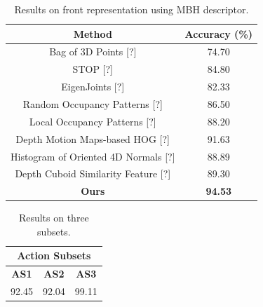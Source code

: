 \documentclass[review]{elsarticle}
\begin{document}
\begin{table}[H]
	\begin{center}
		\begin{tabular}{c|c}
		
		  {\bf Method} & {\bf Accuracy (\%)} \\
		\hline
		Bag of 3D Points [?] &         74.70  \\
		
		      STOP [?] &         84.80  \\
		
		EigenJoints [?] &         82.33  \\
		
		Random Occupancy Patterns [?] &         86.50  \\
		
		Local Occupancy Patterns [?] &         88.20  \\
		
		Depth Motion Maps-based HOG [?] &         91.63  \\
		
		Histogram of Oriented 4D Normals [?] &         88.89  \\
		
		Depth Cuboid Similarity Feature [?] &         89.30  \\
		\hline
		    {\bf Ours} &   {\bf 94.53 } \\
		
		\end{tabular}  
	\end{center}
	\caption{\label{lbl:MBHvsSoAonFront}Results on front representation using MBH descriptor.}
\end{table}

\begin{table}[H]
	\begin{center}
		\begin{tabular}{ccc}
		
		       \multicolumn{ 3}{c}{{\bf Action Subsets}} \\
		\hline
		     {\bf AS1} &      {\bf AS2} &      {\bf AS3} \\
		\hline
		        92.45  &         92.04  &         99.11  \\
		
		\end{tabular}
	\end{center}
	\caption{\label{lbl:MBHandAS123}Results on three subsets.}
\end{table}
\end{document}
